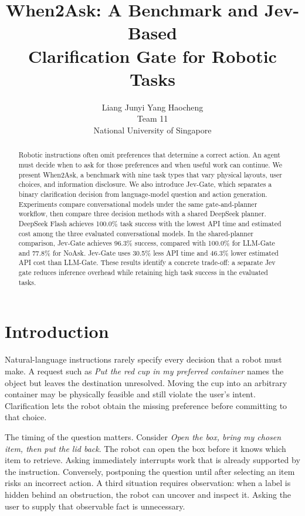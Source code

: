 \documentclass{article}
\title{When2Ask: A Benchmark and Jev-Based\\Clarification Gate for Robotic Tasks}
\author{Liang Junyi \qquad Yang Haocheng\\
Team 11\\
National University of Singapore}
\begin{document}
\raggedbottom
\maketitle

\begin{abstract}
Robotic instructions often omit preferences that determine a correct action.
An agent must decide when to ask for those preferences and when useful work can
continue. We present When2Ask, a benchmark with nine task types that vary
physical layouts, user choices, and information disclosure. We also introduce
Jev-Gate, which separates a binary clarification decision from language-model
question and action generation. Experiments compare conversational models under
the same gate-and-planner workflow, then compare three decision methods with a
shared DeepSeek planner. DeepSeek Flash achieves 100.0\% task success with the
lowest API time and estimated cost among the three evaluated conversational
models. In the shared-planner comparison, Jev-Gate achieves 96.3\% success,
compared with 100.0\% for LLM-Gate and 77.8\% for NoAsk. Jev-Gate uses 30.5\% less
API time and 46.3\% lower estimated API cost than LLM-Gate. These results identify
a concrete trade-off: a separate Jev gate reduces inference overhead while
retaining high task success in the evaluated tasks.
\end{abstract}

\section{Introduction}

Natural-language instructions rarely specify every decision that a robot must
make. A request such as \emph{Put the red cup in my preferred container} names the
object but leaves the destination unresolved. Moving the cup into an arbitrary
container may be physically feasible and still violate the user's intent.
Clarification lets the robot obtain the missing preference before committing
to that choice.

The timing of the question matters. Consider \emph{Open the box, bring my chosen
item, then put the lid back}. The robot can open the box before it knows which
item to retrieve. Asking immediately interrupts work that is already supported
by the instruction. Conversely, postponing the question until after selecting
an item risks an incorrect action. A third situation requires observation:
when a label is hidden behind an obstruction, the robot can uncover and inspect
it. Asking the user to supply that observable fact is unnecessary.
\end{document}
